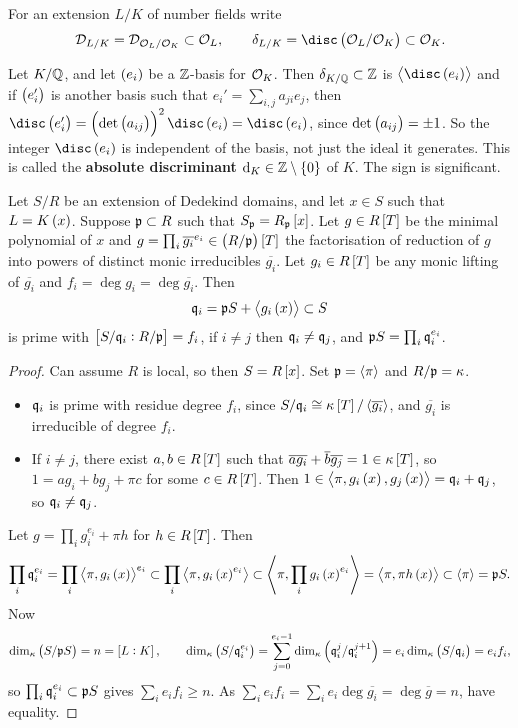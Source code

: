For an extension $ L / K $ of number fields write
$$ \DDD_{L / K} = \DDD_{\OOO_L / \OOO_K} \subset \OOO_L, \qquad \delta_{L / K} = \disc\br{\OOO_L / \OOO_K} \subset \OOO_K. $$

\begin{remark*}
Let $ K / \mathbb{Q} $, and let $ \br{e_i} $ be a $ \mathbb{Z} $-basis for $ \mathcal{O}_K $. Then $ \delta_{K / \mathbb{Q}} \subset \mathbb{Z} $ is $ \abr{\disc \br{e_i}} $ and if $ \br{e_i'} $ is another basis such that $ e_i' = \sum_{i, j} a_{ji}e_j $, then $ \disc \br{e_i'} = \br{\det \br{a_{ij}}}^2\disc \br{e_i} = \disc \br{e_i} $, since $ \det \br{a_{ij}} = \pm 1 $. So the integer $ \disc \br{e_i} $ is independent of the basis, not just the ideal it generates. This is called the \textbf{absolute discriminant} $ \d_K \in \ZZ \setminus \cbr{0} $ of $ K $. The sign is significant.
\end{remark*}

\begin{theorem}
Let $ S / R $ be an extension of Dedekind domains, and let $ x \in S $ such that $ L = K\br{x} $. Suppose $ \mathfrak{p} \subset R $ such that $ S_\ppp = R_\ppp\sbr{x} $. Let $ g \in R\sbr{T} $ be the minimal polynomial of $ x $ and $ g = \prod_i \overline{g_i}^{e_i} \in \br{R / \ppp}\sbr{T} $ the factorisation of reduction of $ g $ into powers of distinct monic irreducibles $ \overline{g_i} $. Let $ g_i \in R\sbr{T} $ be any monic lifting of $ \overline{g_i} $ and $ f_i = \deg g_i = \deg \overline{g_i} $. Then
$$ \qqq_i = \ppp S + \abr{g_i\br{x}} \subset S $$
is prime with $ \sbr{S / \qqq_i : R / \ppp} = f_i $, if $ i \ne j $ then $ \mathfrak{q}_i \ne \mathfrak{q}_j $, and $ \mathfrak{p} S = \prod_i \mathfrak{q}_i^{e_i} $.
\end{theorem}

\begin{proof}
Can assume $ R $ is local, so then $ S = R\sbr{x} $. Set $ \mathfrak{p} = \left\langle \pi \right\rangle $ and $ R / \mathfrak{p} = \kappa $.
\begin{itemize}
\item $ \mathfrak{q}_i $ is prime with residue degree $ f_i $, since $ S / \qqq_i \cong \kappa\sbr{T} / \abr{\overline{g_i}} $, and $ \overline{g_i} $ is irreducible of degree $ f_i $.
\item If $ i \ne j $, there exist $ a, b \in R\sbr{T} $ such that $ \overline{a}\overline{g_i} + \overline{b}\overline{g_j} = 1 \in \kappa\sbr{T} $, so $ 1 = ag_i + bg_j + \pi c $ for some $ c \in R\sbr{T} $. Then $ 1 \in \abr{\pi, g_i\br{x}, g_j\br{x}} = \qqq_i + \qqq_j $, so $ \mathfrak{q}_i \ne \mathfrak{q}_j $.
\end{itemize}
Let $ g = \prod_i g_i^{e_i} + \pi h $ for $ h \in R\sbr{T} $. Then
$$ \prod_i \qqq_i^{e_i} = \prod_i \abr{\pi, g_i\br{x}}^{e_i} \subset \prod_i \abr{\pi, g_i\br{x}^{e_i}} \subset \abr{\pi, \prod_i g_i\br{x}^{e_i}} = \abr{\pi, \pi h\br{x}} \subset \abr{\pi} = \ppp S. $$
Now
$$ \dim_\kappa \br{S / \ppp S} = n = \sbr{L : K}, \qquad \dim_\kappa \br{S / \qqq_i^{e_i}} = \sum_{j = 0}^{e_i - 1} \dim_\kappa \br{\qqq_i^j / \qqq_i^{j + 1}} = e_i\dim_\kappa \br{S / \qqq_i} = e_if_i, $$
so $ \prod_i \mathfrak{q}_i^{e_i} \subset \mathfrak{p} S $ gives $ \sum_i e_if_i \ge n $. As $ \sum_i e_if_i = \sum_i e_i\deg \overline{g_i} = \deg \overline{g} = n $, have equality.
\end{proof}

